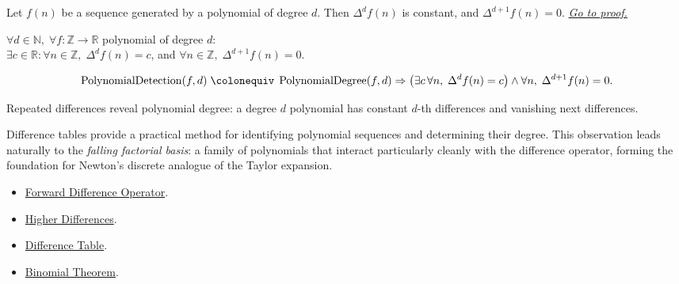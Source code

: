 \begin{center}

\end{center}

\begin{theorem}
\label{thm:polynomial-detection}
Let \(f(n)\) be a sequence generated by a polynomial of degree \(d\). Then
\(\Delta^d f(n)\) is constant, and \(\Delta^{d+1} f(n) = 0\).
\hyperref[prf:polynomial-detection]{\textit{Go to proof.}}
\end{theorem}


\begin{remark*}
\(\forall d \in \mathbb{N},\; \forall f : \mathbb{Z}\to\mathbb{R}\) polynomial of degree \(d\):\\
\(\exists c \in \mathbb{R}: \forall n \in \mathbb{Z},\; \Delta^d f(n) = c\),
and \(\forall n \in \mathbb{Z},\; \Delta^{d+1}f(n) = 0\).
\end{remark*}

\begin{remark*}
\[
  \operatorname{PolynomialDetection}(f,d)
  \;\colonequiv\;
  \operatorname{PolynomialDegree}(f,d)
  \Rightarrow
  \left(
    \exists c\,\forall n,\; \Delta^d f(n)=c
  \right)
  \wedge
  \forall n,\; \Delta^{d+1}f(n)=0.
\]
\end{remark*}

\begin{remark*}[Interpretation]
Repeated differences reveal polynomial degree: a degree \(d\) polynomial has
constant \(d\)-th differences and vanishing next differences.


Difference tables provide a practical method for identifying polynomial
sequences and determining their degree. This observation leads naturally to
the \emph{falling factorial basis}: a family of polynomials that interact
particularly cleanly with the difference operator, forming the foundation
for Newton's discrete analogue of the Taylor expansion.
\end{remark*}

\begin{dependencies}
\begin{itemize}
  \item \hyperref[def:forward-difference]{Forward Difference Operator}.
  \item \hyperref[def:higher-differences]{Higher Differences}.
  \item \hyperref[def:difference-table]{Difference Table}.
  \item \hyperref[thm:binomial-theorem]{Binomial Theorem}.
\end{itemize}
\end{dependencies}
